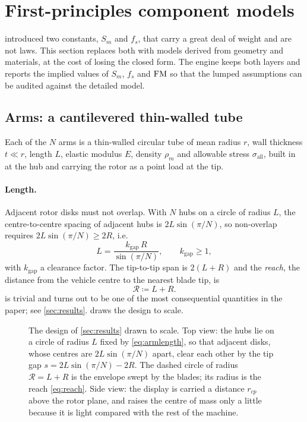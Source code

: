 ﻿\section{First-principles component models}
\label{sec:components}


 introduced two constants, $S_m$ and $f_s$, that carry a
great deal of weight and are not laws. This section replaces both with models
derived from geometry and materials, at the cost of losing the closed form. The
engine keeps both layers and reports the implied values of $S_m$, $f_s$ and
$\mathrm{FM}$ so that the lumped assumptions can be audited against the detailed model.

\subsection{Arms: a cantilevered thin-walled tube}

\begin{model}
\label{mod:arm}
Each of the $N$ arms is a thin-walled circular tube of mean radius $r$, wall
thickness $t\ll r$, length $L$, elastic modulus $E$, density $\rho_m$ and
allowable stress $\sigma_{\mathrm{all}}$, built in at the hub and carrying the
rotor as a point load at the tip.
\end{model}

\paragraph{Length.} Adjacent rotor disks must not overlap. With $N$ hubs on a
circle of radius $L$, the centre-to-centre spacing of adjacent hubs is
$2L\sin(\pi/N)$, so non-overlap requires $2L\sin(\pi/N)\ge 2R$, i.e.
\begin{equation}
  L = \frac{k_{\mathrm{gap}}\,R}{\sin(\pi/N)}, \qquad k_{\mathrm{gap}}\ge1 ,
  \label{eq:armlength}
\end{equation}
with $k_{\mathrm{gap}}$ a clearance factor. The tip-to-tip span is
$2(L+R)$ and the \emph{reach}, the distance from the vehicle centre to the
nearest blade tip, is
\begin{equation}
  \mathcal{R} \coloneqq L + R .
  \label{eq:reach}
\end{equation}
 is trivial and turns out to be one of the most consequential
quantities in the paper; see \cref{sec:results}.  draws the
design to scale.

\begin{figure}[tbp]
\centering

\caption{The design of \cref{sec:results} drawn to scale. Top view: the hubs lie
on a circle of radius $L$ fixed by \cref{eq:armlength}, so that adjacent disks,
whose centres are $2L\sin(\pi/N)$ apart, clear each other by the tip gap
$s=2L\sin(\pi/N)-2R$. The dashed circle of radius $\mathcal{R}=L+R$ is the
envelope swept by the blades; its radius is the reach \cref{eq:reach}. Side
view: the display is carried a distance $r_{cp}$ above the rotor plane, and
raises the centre of mass only a little because it is light compared with the
rest of the machine.}
\label{fig:geometry}
\end{figure}

